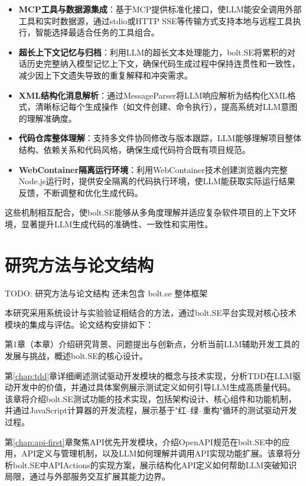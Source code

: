 \begin{itemize}
    \item \textbf{MCP工具与数据源集成}：基于MCP提供标准化接口，使LLM能安全调用外部工具和实时数据源，通过stdio或HTTP SSE等传输方式支持本地与远程工具执行，智能选择最适合任务的工具组合。
    
    \item \textbf{超长上下文记忆与归档}：利用LLM的超长文本处理能力，bolt.SE将累积的对话历史完整纳入模型记忆上下文，确保代码生成过程中保持连贯性和一致性，减少因上下文遗失导致的重复解释和冲突需求。
    
    \item \textbf{XML结构化消息解析}：通过MessageParser将LLM响应解析为结构化XML格式，清晰标记每个生成操作（如文件创建、命令执行），提高系统对LLM意图的理解准确度。
    
    \item \textbf{代码仓库整体理解}：支持多文件协同修改与版本跟踪，LLM能够理解项目整体结构、依赖关系和代码风格，确保生成代码符合既有项目规范。
    
    \item \textbf{WebContainer隔离运行环境}：利用WebContainer技术创建浏览器内完整Node.js运行时，提供安全隔离的代码执行环境，使LLM能获取实际运行结果反馈，不断调整和优化生成代码。
\end{itemize}

这些机制相互配合，使bolt.SE能够从多角度理解并适应复杂软件项目的上下文环境，显著提升LLM生成代码的准确性、一致性和实用性。

\section{研究方法与论文结构}
TODO: 研究方法与论文结构 还未包含 bolt.se 整体框架

本研究采用系统设计与实验验证相结合的方法，通过bolt.SE平台实现对核心技术模块的集成与评估。论文结构安排如下：

第1章（本章）介绍研究背景、问题提出与创新点，分析当前LLM辅助开发工具的发展与挑战，概述bolt.SE的核心设计。

第\ref{chap:tdd}章详细阐述测试驱动开发模块的概念与技术实现，分析TDD在LLM驱动开发中的价值，并通过具体案例展示测试定义如何引导LLM生成高质量代码。该章将介绍bolt.SE测试功能的技术实现，包括架构设计、核心组件和功能机制，并通过JavaScript计算器的开发流程，展示基于"红–绿–重构"循环的测试驱动开发过程。

第\ref{chap:api-first}章聚焦API优先开发模块，介绍OpenAPI规范在bolt.SE中的应用，API定义与管理机制，以及LLM如何理解并调用API实现功能扩展。该章将分析bolt.SE中APIActions的实现方案，展示结构化API定义如何帮助LLM突破知识局限，通过与外部服务交互扩展其能力边界。

